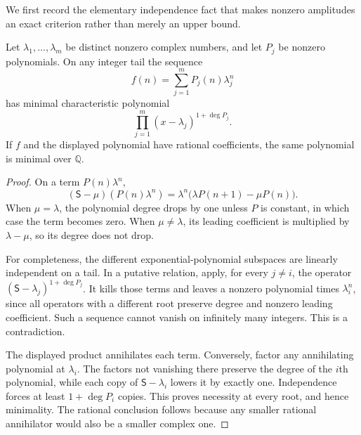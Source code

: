 \documentclass[11pt,a4paper]{article}
\numberwithin{equation}{section}
\theoremstyle{definition}
\theoremstyle{remark}
\begin{document}
We first record the elementary independence fact that makes nonzero
amplitudes an exact criterion rather than merely an upper bound.

\begin{lemma}\label{sc:lem:minimal}
Let $\lambda_1,\ldots,\lambda_m$ be distinct nonzero complex numbers, and
let $P_j$ be nonzero polynomials. On any integer tail the sequence
\[
 f(n)=\sum_{j=1}^m P_j(n)\lambda_j^n
\]
has minimal characteristic polynomial
\[
 \prod_{j=1}^m(x-\lambda_j)^{1+\deg P_j}.
\]
If $f$ and the displayed polynomial have rational coefficients, the same
polynomial is minimal over $\mathbb Q$.
\end{lemma}
\begin{proof}
On a term $P(n)\lambda^n$,
\[
 (\mathsf S-\mu)(P(n)\lambda^n)
 =\lambda^n\bigl(\lambda P(n+1)-\mu P(n)\bigr).
\]
When $\mu=\lambda$, the polynomial degree drops by one unless $P$ is
constant, in which case the term becomes zero. When $\mu\ne\lambda$, its
leading coefficient is multiplied by $\lambda-\mu$, so its degree does not
drop.

For completeness, the different exponential-polynomial subspaces are
linearly independent on a tail. In a putative relation, apply, for every
$j\ne i$, the operator $(\mathsf S-\lambda_j)^{1+\deg P_j}$. It kills those terms
and leaves a nonzero polynomial times $\lambda_i^n$, since all operators
with a different root preserve degree and nonzero leading coefficient.
Such a sequence cannot vanish on infinitely many integers. This is a
contradiction.

The displayed product annihilates each term. Conversely, factor any
annihilating polynomial at $\lambda_i$. The factors not vanishing there
preserve the degree of the $i$th polynomial, while each copy of
$\mathsf S-\lambda_i$ lowers it by exactly one. Independence forces at least
$1+\deg P_i$ copies. This proves necessity at every root, and hence
minimality. The rational conclusion follows because any smaller rational
annihilator would also be a smaller complex one.
\end{proof}
\end{document}
